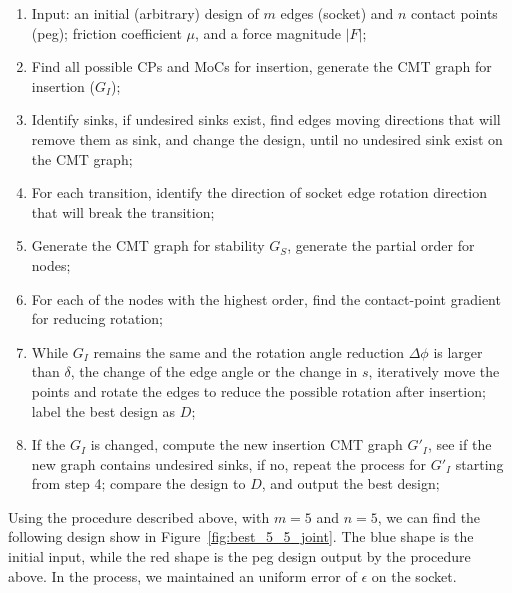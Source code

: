 \documentclass[letterpaper, 10 pt, conference]{ieeeconf}
\begin{document}
\begin{enumerate}
\item Input: an initial (arbitrary) design of $m$ edges (socket) and $n$ contact points (peg); friction coefficient $\mu$, and a force magnitude $|F|$; 
\item Find all possible CPs and MoCs for insertion, generate the CMT graph for insertion ($G_I$); 
\item Identify sinks, if undesired sinks exist, find edges moving directions that will remove them as sink, and change the design, until no undesired sink exist on the CMT graph; 
\item For each transition, identify the direction of socket edge rotation direction that will break the transition; 
\item Generate the CMT graph for stability $G_S$, generate the partial order for nodes; 
\item For each of the nodes with the highest order, find the contact-point gradient for reducing rotation;
\item While $G_I$ remains the same and the rotation angle reduction $\Delta\phi$ is larger than $\delta$, the change of the edge angle or the change in $s$, iteratively move the points and rotate the edges to reduce the possible rotation after insertion; label the best design as $D$; 
\item If the $G_I$ is changed, compute the new insertion CMT graph $G'_I$, see if the new graph contains undesired sinks, if no, repeat the process for $G'_I$ starting from step 4; compare the design to $D$, and output the best design; 
\end{enumerate}

Using the procedure described above, with $m = 5$ and $n=5$, we can find the following design show in Figure~\ref{fig:best_5_5_joint}. The blue shape is the initial input, while the red shape is the peg design output by the procedure above. In the process, we maintained an uniform error of $\epsilon$ on the socket. 
\end{document}
